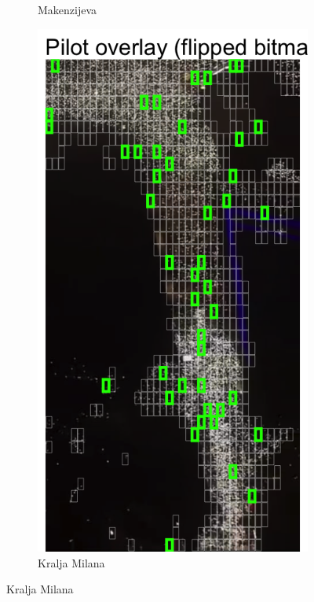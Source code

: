 \documentclass[a4paper,12pt]{article}
\begin{document}
\begin{figure}[H]
\begin{subfigure}[b]{0.3\textwidth}
	  \caption{Makenzijeva}
	  \label{fig:makenzijeva}
	\end{subfigure}
	\hfill
	\begin{subfigure}[b]{0.3\textwidth}
	  \centering
	  \includegraphics[width=\textwidth]{../outputs/sampling_outputs/plot_overlays_image/pilot_overlay_kralja-milana.png}
	  \caption{Kralja Milana}

\end{subfigure}
\end{figure}
\end{document}

